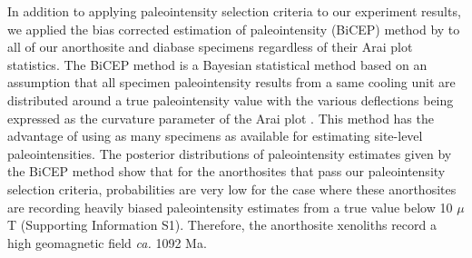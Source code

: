 \documentclass[draft]{agujournal2019}
\begin{document}
In addition to applying paleointensity selection criteria to our experiment results, we applied the bias corrected estimation of paleointensity (BiCEP) method by \cite{Cych2021a} to all of our anorthosite and diabase specimens regardless of their Arai plot statistics. The BiCEP method is a Bayesian statistical method based on an assumption that all specimen paleointensity results from a same cooling unit are distributed around a true paleointensity value with the various deflections being expressed as the curvature parameter of the Arai plot \cite{Paterson2011a}. This method has the advantage of using as many specimens as available for estimating site-level paleointensities. The posterior distributions of paleointensity estimates given by the BiCEP method show that for the anorthosites that pass our paleointensity selection criteria, probabilities are very low for the case where these anorthosites are recording heavily biased paleointensity estimates from a true value below 10 $\mu$T (Supporting Information S1). Therefore, the anorthosite xenoliths record a high geomagnetic field \textit{ca.} 1092 Ma. 
\end{document}

